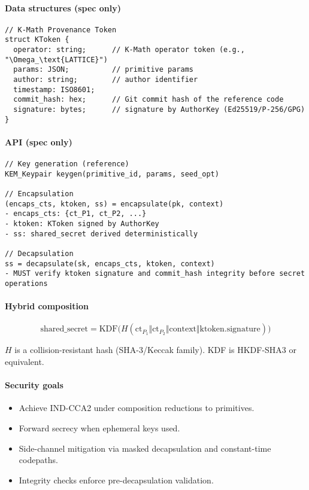 \documentclass[11pt, a4paper]{article}
\begin{document}
\paragraph{Data structures (spec only)}
\begin{verbatim}
// K-Math Provenance Token
struct KToken {
  operator: string;      // K-Math operator token (e.g., "\Omega_\text{LATTICE}")
  params: JSON;          // primitive params
  author: string;        // author identifier
  timestamp: ISO8601;
  commit_hash: hex;      // Git commit hash of the reference code
  signature: bytes;      // signature by AuthorKey (Ed25519/P-256/GPG)
}
\end{verbatim}

\paragraph{API (spec only)}
\begin{verbatim}
// Key generation (reference)
KEM_Keypair keygen(primitive_id, params, seed_opt)

// Encapsulation
(encaps_cts, ktoken, ss) = encapsulate(pk, context)
- encaps_cts: {ct_P1, ct_P2, ...}
- ktoken: KToken signed by AuthorKey
- ss: shared_secret derived deterministically

// Decapsulation
ss = decapsulate(sk, encaps_cts, ktoken, context)
- MUST verify ktoken signature and commit_hash integrity before secret operations
\end{verbatim}

\paragraph{Hybrid composition}
\[
\text{shared\_secret} = \text{KDF}\bigl( H( \text{ct}_{P_1} \Vert \text{ct}_{P_2} \Vert \text{context} \Vert \text{ktoken.signature} ) \bigr)
\]

$H$ is a collision-resistant hash (SHA-3/Keccak family).\newline
KDF is HKDF-SHA3 or equivalent.

\paragraph{Security goals}
\begin{itemize}
    \item Achieve IND-CCA2 under composition reductions to primitives.
    \item Forward secrecy when ephemeral keys used.
    \item Side-channel mitigation via masked decapsulation and constant-time codepaths.
    \item Integrity checks enforce pre-decapsulation validation.
\end{itemize}
\end{document}
